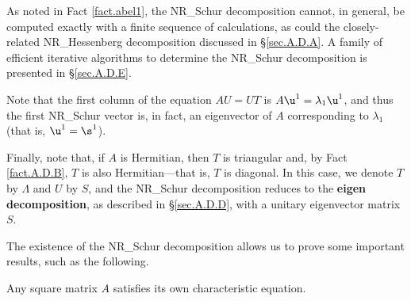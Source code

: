 As noted in Fact \ref{fact.abel1}, the NR_Schur decomposition cannot, in general, be
computed exactly with a finite sequence of calculations, as could the
closely-related NR_Hessenberg decomposition discussed in \S \ref{sec.A.D.A}.
A family of efficient iterative algorithms to determine
the NR_Schur decomposition is presented in \S \ref{sec.A.D.E}.

Note that the first column of the equation $AU=UT$ is $A\u^1=\lambda_1\u^1$, and thus the
first NR_Schur vector is, in fact, an eigenvector of $A$ corresponding to $\lambda_1$ (that is, $\u^1=\s^1$).

Finally, note that, if $A$ is Hermitian, then $T$ is triangular and,
by Fact \ref{fact.A.D.B}, $T$ is also Hermitian---that is, $T$ is diagonal.  In
this case, we denote $T$ by $\Lambda$ and $U$ by $S$, and the NR_Schur
decomposition reduces to the {\bf eigen decomposition}, as described
in \S \ref{sec.A.D.D}, with a unitary eigenvector matrix $S$.


\noindent The existence of the NR_Schur decomposition allows us to prove some
important results, such as the following.

\begin{fact} \label{fact.A.D.C.Bc} Any square
matrix $A$ satisfies its own characteristic equation.
\end{fact}

